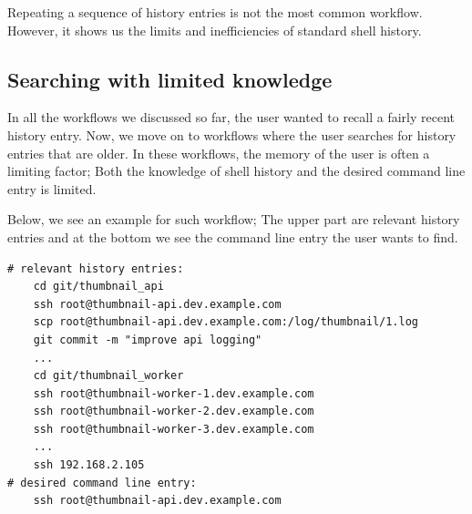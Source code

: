 \documentclass[thesis=M,english]{FITthesis}[2012/10/20]
\newcommand{\redtext}[1]{\textcolor{red}{[[#1]]}}
\begin{document}

Repeating a sequence of history entries is not the most common workflow. However, it shows us the limits and inefficiencies of standard shell history.


\subsection{Searching with limited knowledge}

In all the workflows we discussed so far, the user wanted to recall a fairly recent history entry. Now, we move on to workflows where the user searches for history entries that are older. In these workflows, the memory of the user is often a limiting factor; Both the knowledge of shell history and the desired command line entry is limited.

Below, we see an example for such workflow; The upper part are relevant history entries and at the bottom we see the command line entry the user wants to find. 



        

\begin{verbatim}
# relevant history entries:
    cd git/thumbnail_api
    ssh root@thumbnail-api.dev.example.com
    scp root@thumbnail-api.dev.example.com:/log/thumbnail/1.log
    git commit -m "improve api logging"
    ...
    cd git/thumbnail_worker
    ssh root@thumbnail-worker-1.dev.example.com
    ssh root@thumbnail-worker-2.dev.example.com
    ssh root@thumbnail-worker-3.dev.example.com
    ...
    ssh 192.168.2.105
# desired command line entry:
    ssh root@thumbnail-api.dev.example.com
\end{verbatim}
\end{document}
